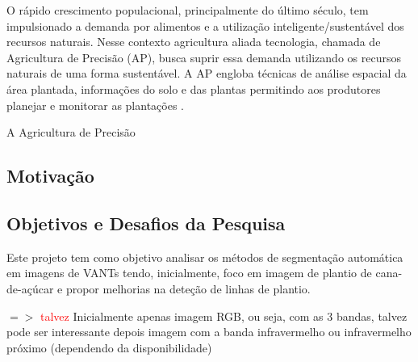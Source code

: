\documentclass[12pt, a4paper, english, brazil]{article}
\begin{document}
O rápido crescimento populacional, principalmente do último século, tem impulsionado a demanda por alimentos e a utilização inteligente/sustentável dos recursos naturais. Nesse contexto agricultura aliada tecnologia, chamada de Agricultura de Precisão (AP), busca suprir essa demanda utilizando os recursos naturais de uma forma sustentável. A AP engloba técnicas de análise espacial da área plantada, informações do solo e das plantas permitindo aos produtores planejar e monitorar as plantações \cite{Blasch_2020}.

A Agricultura de Precisão \cite{Bolfe_2020, Blasch_20202}



\subsection{Motivação}

\subsection{Objetivos e Desafios da Pesquisa}

Este projeto tem como objetivo analisar os métodos de segmentação automática em imagens de VANTs tendo, inicialmente, foco em imagem de plantio de cana-de-açúcar e propor melhorias na deteção de linhas de plantio. 

$=>$ \textcolor{red}{talvez} Inicialmente apenas imagem RGB, ou seja, com as 3 bandas, talvez pode ser interessante depois imagem com a banda infravermelho ou infravermelho próximo (dependendo da disponibilidade)
\end{document}
